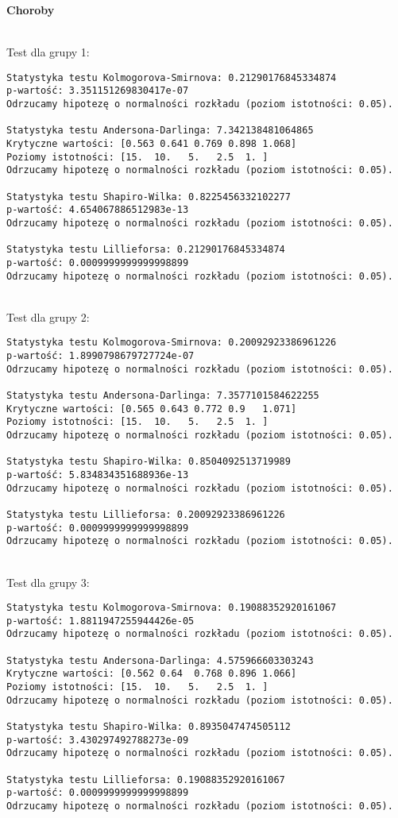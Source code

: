\documentclass[12pt,a4paper]{article}
\begin{document}
\newpage
\begin{center}
    \textbf{Choroby}
\end{center}
\\
Test dla grupy 1:
\begin{lstlisting}
Statystyka testu Kolmogorova-Smirnova: 0.21290176845334874
p-wartość: 3.351151269830417e-07
Odrzucamy hipotezę o normalności rozkładu (poziom istotności: 0.05).

Statystyka testu Andersona-Darlinga: 7.342138481064865
Krytyczne wartości: [0.563 0.641 0.769 0.898 1.068]
Poziomy istotności: [15.  10.   5.   2.5  1. ]
Odrzucamy hipotezę o normalności rozkładu (poziom istotności: 0.05).

Statystyka testu Shapiro-Wilka: 0.8225456332102277
p-wartość: 4.654067886512983e-13
Odrzucamy hipotezę o normalności rozkładu (poziom istotności: 0.05).

Statystyka testu Lillieforsa: 0.21290176845334874
p-wartość: 0.0009999999999998899
Odrzucamy hipotezę o normalności rozkładu (poziom istotności: 0.05).
\end{lstlisting}
\\
Test dla grupy 2:
\begin{lstlisting}
Statystyka testu Kolmogorova-Smirnova: 0.20092923386961226
p-wartość: 1.8990798679727724e-07
Odrzucamy hipotezę o normalności rozkładu (poziom istotności: 0.05).

Statystyka testu Andersona-Darlinga: 7.3577101584622255
Krytyczne wartości: [0.565 0.643 0.772 0.9   1.071]
Poziomy istotności: [15.  10.   5.   2.5  1. ]
Odrzucamy hipotezę o normalności rozkładu (poziom istotności: 0.05).

Statystyka testu Shapiro-Wilka: 0.8504092513719989
p-wartość: 5.834834351688936e-13
Odrzucamy hipotezę o normalności rozkładu (poziom istotności: 0.05).

Statystyka testu Lillieforsa: 0.20092923386961226
p-wartość: 0.0009999999999998899
Odrzucamy hipotezę o normalności rozkładu (poziom istotności: 0.05).
\end{lstlisting}
\\
Test dla grupy 3:
\begin{lstlisting}
Statystyka testu Kolmogorova-Smirnova: 0.19088352920161067
p-wartość: 1.8811947255944426e-05
Odrzucamy hipotezę o normalności rozkładu (poziom istotności: 0.05).

Statystyka testu Andersona-Darlinga: 4.575966603303243
Krytyczne wartości: [0.562 0.64  0.768 0.896 1.066]
Poziomy istotności: [15.  10.   5.   2.5  1. ]
Odrzucamy hipotezę o normalności rozkładu (poziom istotności: 0.05).

Statystyka testu Shapiro-Wilka: 0.8935047474505112
p-wartość: 3.430297492788273e-09
Odrzucamy hipotezę o normalności rozkładu (poziom istotności: 0.05).

Statystyka testu Lillieforsa: 0.19088352920161067
p-wartość: 0.0009999999999998899
Odrzucamy hipotezę o normalności rozkładu (poziom istotności: 0.05).
\end{lstlisting}
\end{document}
